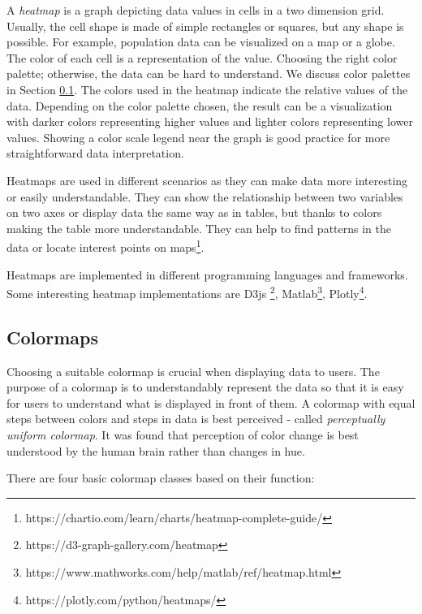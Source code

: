 A \textit{heatmap} is a graph depicting data values in cells in a two dimension grid. Usually, the cell shape is made of simple rectangles or squares, but any shape is possible. For example, population data can be visualized on a map or a globe. The color of each cell is a representation of the value. Choosing the right color palette; otherwise, the data can be hard to understand. We discuss color palettes in Section \ref{txt.design.frontend.colormap}. The colors used in the heatmap indicate the relative values of the data. Depending on the color palette chosen, the result can be a visualization with darker colors representing higher values and lighter colors representing lower values. Showing a color scale legend near the graph is good practice for more straightforward data interpretation.

Heatmaps are used in different scenarios as they can make data more interesting or easily understandable. They can show the relationship between two variables on two axes or display data the same way as in tables, but thanks to colors making the table more understandable. They can help to find patterns in the data or locate interest points on maps\footnote{https://chartio.com/learn/charts/heatmap-complete-guide/}.

Heatmaps are implemented in different programming languages and frameworks. Some interesting heatmap implementations are D3js \footnote{https://d3-graph-gallery.com/heatmap}, Matlab\footnote{https://www.mathworks.com/help/matlab/ref/heatmap.html}, Plotly\footnote{https://plotly.com/python/heatmaps/}.



\subsection{Colormaps}\label{txt.design.frontend.colormap}

Choosing a suitable colormap is crucial when displaying data to users. The purpose of a colormap is to understandably represent the data so that it is easy for users to understand what is displayed in front of them.  A colormap with equal steps between colors and steps in data is best perceived - called \textit{perceptually uniform colormap}. It was found that perception of color change is best understood by the human brain rather than changes in hue. 

There are four basic colormap classes based on their function:

